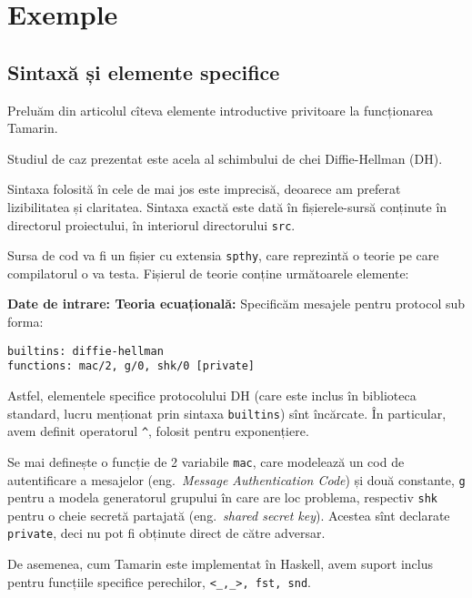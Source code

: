 
\chapter{Exemple}

\section{Sintaxă și elemente specifice}

Preluăm din articolul \cite{DBLP:journals/siglog/BasinCDS17} cîteva
elemente introductive privitoare la funcționarea Tamarin.

Studiul de caz prezentat este acela al schimbului de chei Diffie-Hellman (DH).

\begin{remark}\label{rk:sintaxa}
  Sintaxa folosită în cele de mai jos este imprecisă, deoarece am
  preferat lizibilitatea și claritatea. Sintaxa exactă este dată în
  fișierele-sursă conținute în directorul proiectului, în interiorul
  directorului \texttt{src}.
\end{remark}

Sursa de cod va fi un fișier cu extensia \texttt{spthy}, care reprezintă
o teorie pe care compilatorul o va testa. Fișierul de teorie conține
următoarele elemente:

\textbf{Date de intrare: Teoria ecuațională:} Specificăm mesajele pentru
protocol sub forma:

\begin{verbatim}
builtins: diffie-hellman
functions: mac/2, g/0, shk/0 [private]
\end{verbatim}

Astfel, elementele specifice protocolului DH (care este inclus în biblioteca
standard, lucru menționat prin sintaxa \texttt{builtins}) sînt încărcate.
În particular, avem definit operatorul \texttt{\^}, folosit pentru exponențiere.

Se mai definește o funcție de 2 variabile \texttt{mac}, care modelează un
cod de autentificare a mesajelor (eng.\ \emph{Message Authentication Code})
și două constante, \texttt{g} pentru a modela generatorul grupului în care
are loc problema, respectiv \texttt{shk} pentru o cheie secretă partajată
(eng.\ \emph{shared secret key}). Acestea sînt declarate \texttt{private},
deci nu pot fi obținute direct de către adversar.

De asemenea, cum Tamarin este implementat în Haskell, avem suport inclus
pentru func\-ți\-i\-le specifice perechilor, \texttt{<\_,\_>, fst, snd}.

